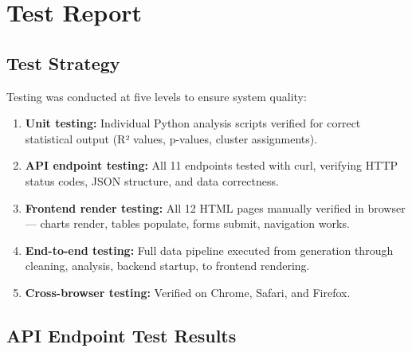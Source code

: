 \documentclass[12pt,a4paper]{report}
\begin{document}
\newpage

\chapter{Test Report}

\section{Test Strategy}

Testing was conducted at five levels to ensure system quality:

\begin{enumerate}[itemsep=3pt]
  \item \textbf{Unit testing:} Individual Python analysis scripts verified for correct statistical output (R² values, p-values, cluster assignments).
  \item \textbf{API endpoint testing:} All 11 endpoints tested with curl, verifying HTTP status codes, JSON structure, and data correctness.
  \item \textbf{Frontend render testing:} All 12 HTML pages manually verified in browser --- charts render, tables populate, forms submit, navigation works.
  \item \textbf{End-to-end testing:} Full data pipeline executed from generation through cleaning, analysis, backend startup, to frontend rendering.
  \item \textbf{Cross-browser testing:} Verified on Chrome, Safari, and Firefox.
\end{enumerate}

\section{API Endpoint Test Results}
\end{document}

